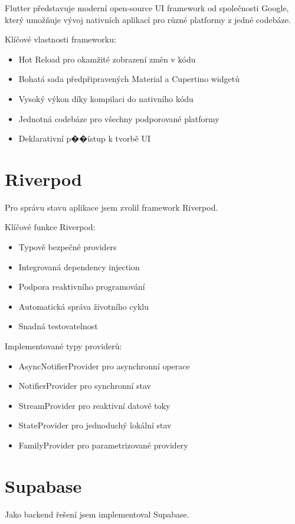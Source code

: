\documentclass[12pt, a4paper, twoside, openright]{report}
\begin{document}
	Flutter představuje moderní open-source UI framework od společnosti Google, který umožňuje vývoj nativních aplikací pro různé platformy z jedné codebáze.

	Klíčové vlastnosti frameworku:
	\begin{itemize}
		\item Hot Reload pro okamžité zobrazení změn v kódu
		\item Bohatá sada předpřipravených Material a Cupertino widgetů
		\item Vysoký výkon díky kompilaci do nativního kódu
		\item Jednotná codebáze pro všechny podporované platformy
		\item Deklarativní p��ístup k tvorbě UI
	\end{itemize}

	\section{Riverpod}
	Pro správu stavu aplikace jsem zvolil framework Riverpod.

	Klíčové funkce Riverpod:
	\begin{itemize}
		\item Typově bezpečné providers
		\item Integrovaná dependency injection
		\item Podpora reaktivního programování
		\item Automatická správa životního cyklu
		\item Snadná testovatelnost
	\end{itemize}

	Implementované typy providerů:
	\begin{itemize}
		\item AsyncNotifierProvider pro asynchronní operace
		\item NotifierProvider pro synchronní stav
		\item StreamProvider pro reaktivní datové toky
		\item StateProvider pro jednoduchý lokální stav
		\item FamilyProvider pro parametrizované providery
	\end{itemize}

	\section{Supabase}
	Jako backend řešení jsem implementoval Supabase.
\end{document}
